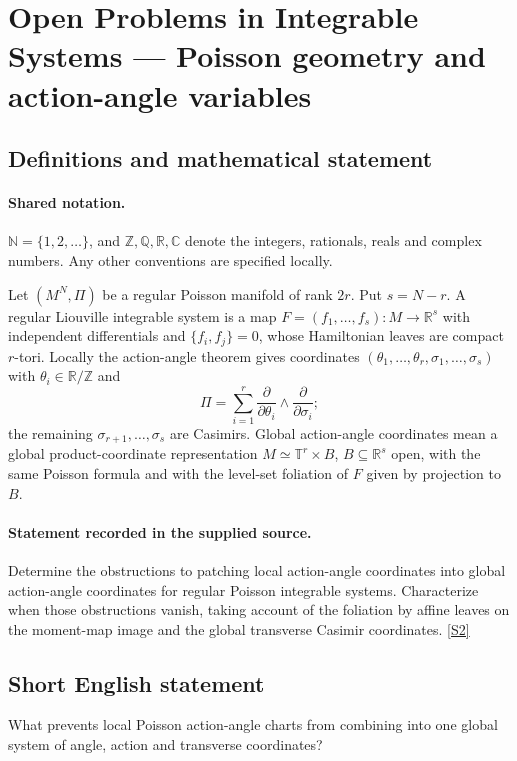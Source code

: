 \documentclass[11pt]{article}
\newcommand{\sref}[2]{\hyperlink{source:#1:#2}{[S#2]}}
\begin{document}
\section{Open Problems in Integrable Systems — Poisson geometry and action-angle variables}\label{statement}

\subsection{Definitions and mathematical statement}

\paragraph{Shared notation.}$\mathbb N=\{1,2,\ldots\}$, and $\mathbb Z,\mathbb Q,\mathbb R,\mathbb C$ denote the integers, rationals, reals and complex numbers. Any other conventions are specified locally.


Let $(M^N,\Pi)$ be a regular Poisson manifold of rank $2r$. Put $s=N-r$. A regular Liouville integrable system is a map $F=(f_1,\ldots,f_s):M\to\mathbb R^s$ with independent differentials and $\{f_i,f_j\}=0$, whose Hamiltonian leaves are compact $r$-tori. Locally the action-angle theorem gives coordinates $(\theta_1,\ldots,\theta_r,\sigma_1,\ldots,\sigma_s)$ with $\theta_i\in\mathbb R/\mathbb Z$ and
\[\Pi=\sum_{i=1}^r\frac{\partial}{\partial\theta_i}\wedge\frac{\partial}{\partial\sigma_i};\]
the remaining $\sigma_{r+1},\ldots,\sigma_s$ are Casimirs. Global action-angle coordinates mean a global product-coordinate representation $M\simeq\mathbb T^r\times B$, $B\subseteq\mathbb R^s$ open, with the same Poisson formula and with the level-set foliation of $F$ given by projection to $B$.
\paragraph{Statement recorded in the supplied source.}
Determine the obstructions to patching local action-angle coordinates into global action-angle coordinates for regular Poisson integrable systems. Characterize when those obstructions vanish, taking account of the foliation by affine leaves on the moment-map image and the global transverse Casimir coordinates. \sref{statement}{2}
\subsection{Short English statement}
What prevents local Poisson action-angle charts from combining into one global system of angle, action and transverse coordinates?
\end{document}

